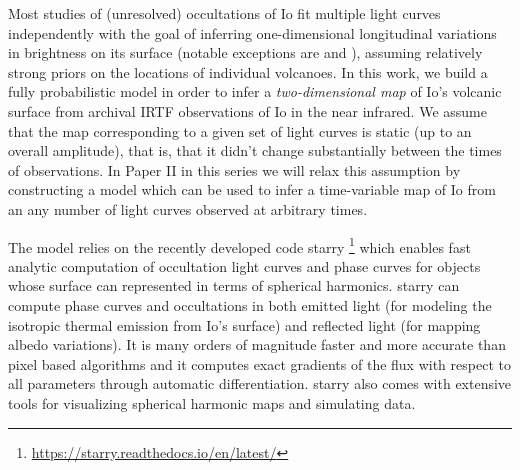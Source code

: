 \documentclass[modern]{aastex62}
\begin{document}
Most studies of (unresolved) occultations of Io fit multiple light curves independently with the goal of inferring one-dimensional longitudinal variations in brightness on its surface (notable exceptions are \cite{spencer1994} and \cite{dekleer2017}), assuming relatively strong priors on the locations of individual volcanoes.
In this work, we build a fully probabilistic model in order to infer a \emph{two-dimensional map} of Io's volcanic surface from archival IRTF observations of Io in the near infrared.
We assume that the map corresponding to a given set of light curves is static (up to an overall amplitude), that is, that it didn't change substantially between the times of observations.
In Paper II in this series we will relax this assumption by constructing a model which can be used to infer a time-variable map of Io from an any number of light curves observed at arbitrary times.

The model relies on the recently developed code \textsf{starry} \footnote{\url{https://starry.readthedocs.io/en/latest/}} \citep[][Luger et al. 2021 in prep]{luger2019a} which enables fast analytic computation of occultation light curves and phase curves for objects whose surface can represented in terms of spherical harmonics.
\textsf{starry} can compute phase curves and occultations in both emitted light (for modeling the isotropic thermal emission from Io's surface) and reflected light (for mapping albedo variations).
It is many orders of magnitude faster and more accurate than pixel based algorithms and it computes exact gradients of the flux with respect to all parameters through automatic differentiation.
\textsf{starry} also comes with extensive tools for visualizing spherical harmonic maps and simulating data.
\end{document}
